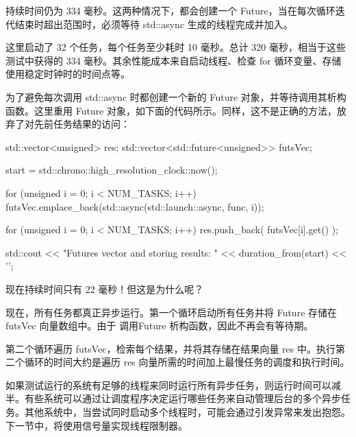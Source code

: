持续时间仍为 334 毫秒。这两种情况下，都会创建一个 Future，当在每次循环迭代结束时超出范围时，必须等待 std::async 生成的线程完成并加入。

这里启动了 32 个任务，每个任务至少耗时 10 毫秒。总计 320 毫秒，相当于这些测试中获得的 334 毫秒。其余性能成本来自启动线程、检查 for 循环变量、存储使用稳定时钟时的时间点等。

为了避免每次调用 std::async 时都创建一个新的 Future 对象，并等待调用其析构函数。这里重用 Future 对象，如下面的代码所示。同样，这不是正确的方法，放弃了对先前任务结果的访问：

\begin{cpp}
std::vector<unsigned> res;
std::vector<std::future<unsigned>> futsVec;

start = std::chrono::high_resolution_clock::now();

for (unsigned i = 0; i < NUM_TASKS; i++) {
    futsVec.emplace_back(std::async(std::launch::async,
                         func, i));
}

for (unsigned i = 0; i < NUM_TASKS; i++) {
    res.push_back( futsVec[i].get() );
}

std::cout << "Futures vector and storing results: "
          << duration_from(start) << '\n';
\end{cpp}

现在持续时间只有 22 毫秒！但这是为什么呢？

现在，所有任务都真正异步运行。第一个循环启动所有任务并将 Future 存储在 futsVec 向量数组中。由于 调用Future 析构函数，因此不再会有等待期。

第二个循环遍历 futsVec，检索每个结果，并将其存储在结果向量 res 中。执行第二个循环的时间大约是遍历 res 向量所需的时间加上最慢任务的调度和执行时间。

如果测试运行的系统有足够的线程来同时运行所有异步任务，则运行时间可以减半。有些系统可以通过让调度程序决定运行哪些任务来自动管理后台的多个异步任务。其他系统中，当尝试同时启动多个线程时，可能会通过引发异常来发出抱怨。下一节中，将使用信号量实现线程限制器。













